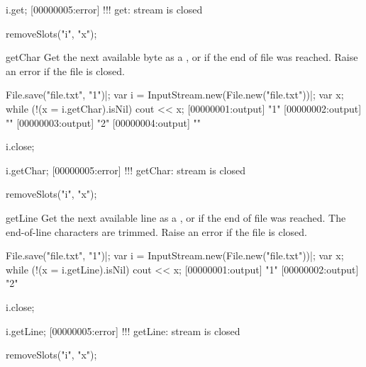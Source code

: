 \begin{urbiscriptapi}
\begin{urbiscript}
i.get;
[00000005:error] !!! get: stream is closed
\end{urbiscript}
\begin{urbicomment}
removeSlots("i", "x");
\end{urbicomment}


\item[getChar]%
  Get the next available byte as a , or 
  if the end of file was reached.  Raise an error if the file is closed.
\begin{urbiscript}
File.save("file.txt", "1\n")|;
var i = InputStream.new(File.new("file.txt"))|;
var x;
while (!(x = i.getChar).isNil)
  cout << x;
[00000001:output] "1"
[00000002:output] "\n"
[00000003:output] "2"
[00000004:output] "\n"

i.close;

i.getChar;
[00000005:error] !!! getChar: stream is closed
\end{urbiscript}
\begin{urbicomment}
removeSlots("i", "x");
\end{urbicomment}


\item[getLine]%
  Get the next available line as a , or  if
  the end of file was reached.  The end-of-line characters are trimmed.
  Raise an error if the file is closed.
\begin{urbiscript}
File.save("file.txt", "1\n")|;
var i = InputStream.new(File.new("file.txt"))|;
var x;
while (!(x = i.getLine).isNil)
  cout << x;
[00000001:output] "1"
[00000002:output] "2"

i.close;

i.getLine;
[00000005:error] !!! getLine: stream is closed
\end{urbiscript}
\begin{urbicomment}
removeSlots("i", "x");
\end{urbicomment}
\end{urbiscriptapi}


